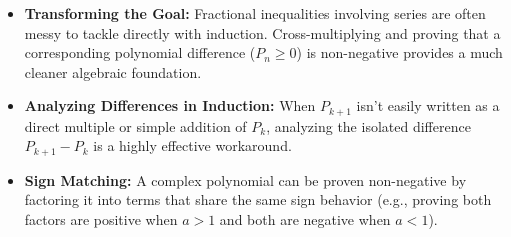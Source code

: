 \begin{takeaways}
\begin{itemize}
    \item \textbf{Transforming the Goal:} Fractional inequalities involving series are often messy to tackle directly with induction. Cross-multiplying and proving that a corresponding polynomial difference ($P_n \ge 0$) is non-negative provides a much cleaner algebraic foundation.
    \item \textbf{Analyzing Differences in Induction:} When $P_{k+1}$ isn't easily written as a direct multiple or simple addition of $P_k$, analyzing the isolated difference $P_{k+1} - P_k$ is a highly effective workaround. 
    \item \textbf{Sign Matching:} A complex polynomial can be proven non-negative by factoring it into terms that share the same sign behavior (e.g., proving both factors are positive when $a>1$ and both are negative when $a<1$).
\end{itemize}
\end{takeaways}
